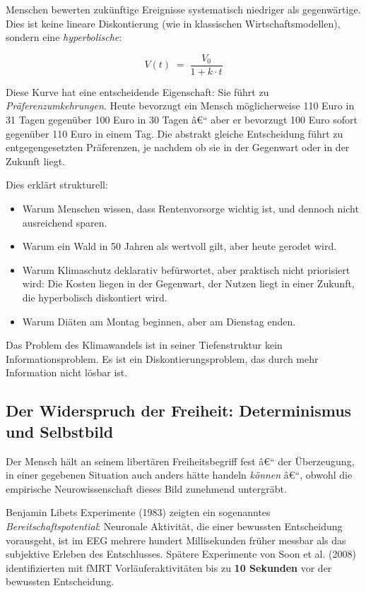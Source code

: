 ﻿\documentclass[12pt, a4paper]{article}
\begin{document}
Menschen bewerten zukünftige Ereignisse systematisch niedriger als
gegenwärtige. Dies ist keine lineare Diskontierung (wie in klassischen
Wirtschaftsmodellen), sondern eine \emph{hyperbolische}:

\begin{equation}
  V(t) \;=\; \frac{V_0}{1 + k \cdot t}
\end{equation}

Diese Kurve hat eine entscheidende Eigenschaft: Sie führt zu \emph{Präferenzumkehrungen}.
Heute bevorzugt ein Mensch möglicherweise 110 Euro in 31 Tagen gegenüber 100 Euro
in 30 Tagen â€“ aber er bevorzugt 100 Euro sofort gegenüber 110 Euro in einem Tag.
Die abstrakt gleiche Entscheidung führt zu entgegengesetzten Präferenzen, je
nachdem ob sie in der Gegenwart oder in der Zukunft liegt.

Dies erklärt strukturell:
\begin{itemize}
  \item Warum Menschen wissen, dass Rentenvorsorge wichtig ist, und dennoch nicht
    ausreichend sparen.
  \item Warum ein Wald in 50 Jahren als wertvoll gilt, aber heute gerodet wird.
  \item Warum Klimaschutz deklarativ befürwortet, aber praktisch nicht priorisiert
    wird: Die Kosten liegen in der Gegenwart, der Nutzen liegt in einer Zukunft,
    die hyperbolisch diskontiert wird.
  \item Warum Diäten am Montag beginnen, aber am Dienstag enden.
\end{itemize}

Das Problem des Klimawandels ist in seiner Tiefenstruktur kein Infor\-mations\-problem.
Es ist ein Dis\-kon\-tierungs\-problem, das durch mehr Information nicht lösbar ist.

\subsection{Der Widerspruch der Freiheit: Determinismus und Selbstbild}

Der Mensch hält an seinem libertären Freiheitsbegriff fest â€“ der Überzeugung,
in einer gegebenen Situation auch anders hätte handeln \emph{können} â€“, obwohl
die empirische Neurowissenschaft dieses Bild zunehmend untergräbt.

Benjamin Libets Experimente (1983) zeigten ein sogenanntes \emph{Bereitschaftspotential}:
Neuronale Aktivität, die einer bewussten Entscheidung vorausgeht, ist im EEG
mehrere hundert Millisekunden früher messbar als das subjektive Erleben des
Entschlusses. Spätere Experimente von Soon et al. (2008) identifizierten mit
fMRT Vorläuferaktivitäten bis zu \textbf{10 Sekunden} vor der bewussten
Entscheidung.
\end{document}
